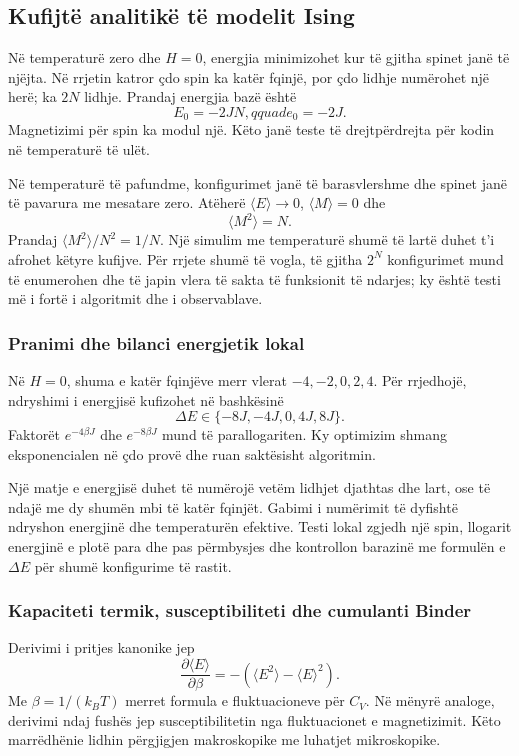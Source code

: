 \subsection{Kufijtë analitikë të modelit Ising}
Në temperaturë zero dhe $H=0$, energjia minimizohet kur të gjitha spinet janë të njëjta. Në rrjetin katror çdo spin ka katër fqinjë, por çdo lidhje numërohet një herë; ka $2N$ lidhje. Prandaj energjia bazë është
\begin{equation}
 E_0=-2JN,qquad e_0=-2J.
\end{equation}
Magnetizimi për spin ka modul një. Këto janë teste të drejtpërdrejta për kodin në temperaturë të ulët.

Në temperaturë të pafundme, konfigurimet janë të barasvlershme dhe spinet janë të pavarura me mesatare zero. Atëherë $\langle E\rangle\to0$, $\langle M\rangle=0$ dhe
\begin{equation}
 \langle M^2\rangle=N.
\end{equation}
Prandaj $\langle M^2\rangle/N^2=1/N$. Një simulim me temperaturë shumë të lartë duhet t'i afrohet këtyre kufijve. Për rrjete shumë të vogla, të gjitha $2^N$ konfigurimet mund të enumerohen dhe të japin vlera të sakta të funksionit të ndarjes; ky është testi më i fortë i algoritmit dhe i observablave.

\subsubsection{Pranimi dhe bilanci energjetik lokal}
Në $H=0$, shuma e katër fqinjëve merr vlerat $-4,-2,0,2,4$. Për rrjedhojë, ndryshimi i energjisë kufizohet në bashkësinë
\begin{equation}
 \Delta E\in\{-8J,-4J,0,4J,8J\}.
\end{equation}
Faktorët $e^{-4\beta J}$ dhe $e^{-8\beta J}$ mund të parallogariten. Ky optimizim shmang eksponencialen në çdo provë dhe ruan saktësisht algoritmin.

Një matje e energjisë duhet të numërojë vetëm lidhjet djathtas dhe lart, ose të ndajë me dy shumën mbi të katër fqinjët. Gabimi i numërimit të dyfishtë ndryshon energjinë dhe temperaturën efektive. Testi lokal zgjedh një spin, llogarit energjinë e plotë para dhe pas përmbysjes dhe kontrollon barazinë me formulën e $\Delta E$ për shumë konfigurime të rastit.

\subsubsection{Kapaciteti termik, susceptibiliteti dhe cumulanti Binder}
Derivimi i pritjes kanonike jep
\begin{equation}
 \frac{\partial\langle E\rangle}{\partial\beta}
 =-\left(\langle E^2\rangle-\langle E\rangle^2\right).
\end{equation}
Me $\beta=1/(k_BT)$ merret formula e fluktuacioneve për $C_V$. Në mënyrë analoge, derivimi ndaj fushës jep susceptibilitetin nga fluktuacionet e magnetizimit. Këto marrëdhënie lidhin përgjigjen makroskopike me luhatjet mikroskopike.

